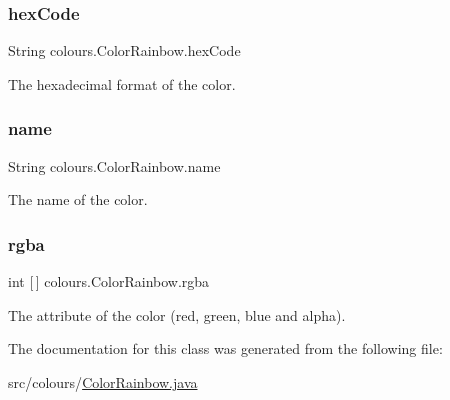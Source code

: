 \subsubsection{\texorpdfstring{hex\+Code}{hexCode}}
{\footnotesize\ttfamily String colours.\+Color\+Rainbow.\+hex\+Code\hspace{0.3cm}{\ttfamily [private]}}

The hexadecimal format of the color. \mbox{\label{classcolours_1_1_color_rainbow_a829067e626095a0cb25ef7f708ddccb3}} 
\subsubsection{\texorpdfstring{name}{name}}
{\footnotesize\ttfamily String colours.\+Color\+Rainbow.\+name\hspace{0.3cm}{\ttfamily [private]}}

The name of the color. \mbox{\label{classcolours_1_1_color_rainbow_aea1f40a66bcc34656e109edcc9cf86dd}} 
\subsubsection{\texorpdfstring{rgba}{rgba}}
{\footnotesize\ttfamily int \mbox{[}$\,$\mbox{]} colours.\+Color\+Rainbow.\+rgba\hspace{0.3cm}{\ttfamily [private]}}

The attribute of the color (red, green, blue and alpha). 

The documentation for this class was generated from the following file\+:\begin{DoxyCompactItemize}
\item 
src/colours/\hyperlink{_color_rainbow_8java}{Color\+Rainbow.\+java}\end{DoxyCompactItemize}

